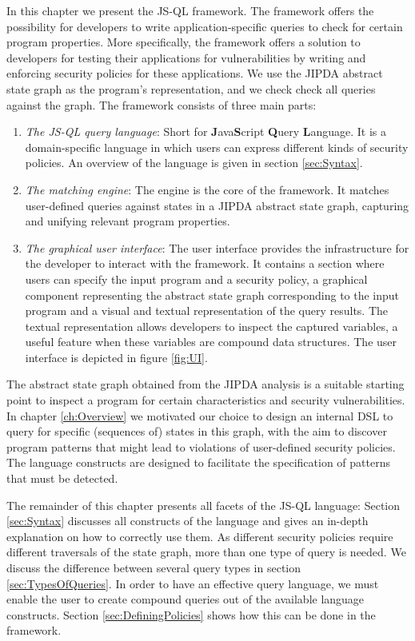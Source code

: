 In this chapter we present the JS-QL framework. The framework offers the possibility for developers to write application-specific queries to check for certain program properties. More specifically, the framework offers a solution to developers for testing their applications for vulnerabilities by writing and enforcing security policies for these applications. We use the JIPDA abstract state graph as the program's representation, and we check check all queries against the graph. The framework consists of three main parts: 
\begin{enumerate}
\item \textit{The JS-QL query language}: Short for \textbf{J}ava\textbf{S}cript \textbf{Q}uery \textbf{L}anguage. It is a domain-specific language in which users can express different kinds of security policies. An overview of the language is given in section \ref{sec:Syntax}.
\item \textit{The matching engine}: The engine is the core of the framework. It matches user-defined queries against states in a JIPDA abstract state graph, capturing and unifying relevant program properties.
\item \textit{The graphical user interface}: The user interface provides the infrastructure for the developer to interact with the framework. It contains a section where users can specify the input program and a security policy, a graphical component representing the abstract state graph corresponding to the input program and a visual and textual representation of the query results. The textual representation allows developers to inspect the captured variables, a useful feature when these variables are compound data structures. The user interface is depicted in figure \ref{fig:UI}.
\end{enumerate}

The abstract state graph obtained from the JIPDA analysis is a suitable starting point to inspect a program for certain characteristics and security vulnerabilities. In chapter \ref{ch:Overview} we motivated our choice to design an internal DSL to query for specific (sequences of) states in this graph, with the aim to discover program patterns that might lead to violations of user-defined security policies. The language constructs are designed to facilitate the specification of patterns that must be detected. 

The remainder of this chapter presents all facets of the JS-QL language: Section \ref{sec:Syntax} discusses all constructs of the language and gives an in-depth explanation on how to correctly use them. As different security policies require different traversals of the state graph, more than one type of query is needed. We discuss the difference between several query types in section \ref{sec:TypesOfQueries}. In order to have an effective query language, we must enable the user to create compound queries out of the available language constructs. Section \ref{sec:DefiningPolicies} shows how this can be done in the framework.

